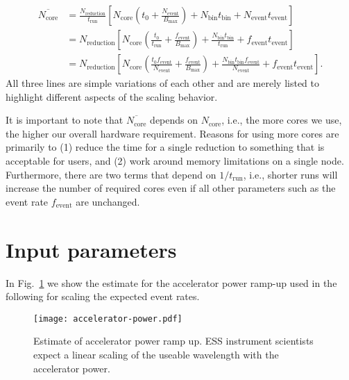 \documentclass[a4paper,english,numbers=noenddot,bibliography=totoc,chapterprefix=on,DIV=12]{scrartcl}
\newcommand{\Trun}{t_{\text{run}}}
\newcommand{\Tbin}{t_{\text{bin}}}
\newcommand{\Tevent}{t_{\text{event}}}
\newcommand{\Nbin}{N_{\text{bin}}}
\newcommand{\Ncore}{N_{\text{core}}}
\newcommand{\Nevent}{N_{\text{event}}}
\newcommand{\Nreduction}{N_{\text{reduction}}}
\newcommand{\Bmax}{B_{\text{max}}}
\newcommand{\Fevent}{f_{\text{event}}}
\begin{document}
\begin{align}
  \overline{\Ncore} &= \frac{\Nreduction}{\Trun}\left[\Ncore \left(t_0 + \frac{\Nevent}{\Bmax}\right) + \Nbin\Tbin + \Nevent\Tevent\right]\\
   &= \Nreduction\left[\Ncore \left(\frac{t_0}{\Trun} + \frac{\Fevent}{\Bmax}\right) + \frac{\Nbin\Tbin}{\Trun} + \Fevent\Tevent\right]\\
   &= \Nreduction\left[\Ncore \left(\frac{t_0\Fevent}{\Nevent} + \frac{\Fevent}{\Bmax}\right) + \frac{\Nbin\Tbin\Fevent}{\Nevent} + \Fevent\Tevent\right].
\end{align}
All three lines are simple variations of each other and are merely listed to highlight different aspects of the scaling behavior.

It is important to note that $\overline{\Ncore}$ depends on $\Ncore$, i.e., the more cores we use, the higher our overall hardware requirement.
Reasons for using more cores are primarily to (1) reduce the time for a single reduction to something that is acceptable for users, and (2) work around memory limitations on a single node.
Furthermore, there are two terms that depend on $1/\Trun$, i.e., shorter runs will increase the number of required cores even if all other parameters such as the event rate $\Fevent$ are unchanged.

\section{Input parameters}

In Fig.~\ref{fig:accelerator-power} we show the estimate for the accelerator power ramp-up used in the following for scaling the expected event rates.

\begin{figure}
  \centering
\texttt{[image: accelerator-power.pdf]}
\caption{\label{fig:accelerator-power}Estimate of accelerator power ramp up. ESS instrument scientists expect a linear scaling of the useable wavelength with the accelerator power.}
\end{figure}
\end{document}
